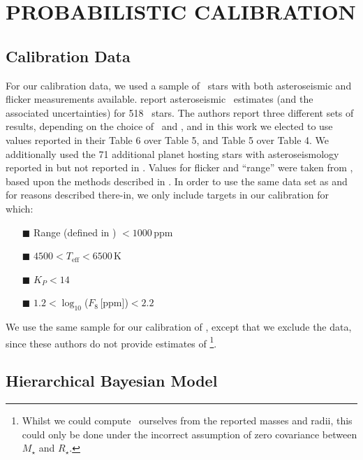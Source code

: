 \section{PROBABILISTIC CALIBRATION}
\label{sec:HBM}


\subsection{Calibration Data}

For our calibration data, we used a sample of \Kepler\ stars with
both asteroseismic and flicker measurements available. \citet{chaplin:2014}
report asteroseismic \rhostar\ estimates (and the associated uncertainties) for
518 \Kepler\ stars. The authors report three different sets of results,
depending on the choice of \Teff\ and \FeH, and in this work we elected to use
values reported in their Table 6 over Table 5, and Table 5 over Table 4. We
additionally used the 71 additional planet hosting stars with asteroseismology
reported in \citet{huber:2013} but not reported in \citet{chaplin:2014}. Values
for flicker and ``range'' were taken from \citet{kipping:2014}, based upon the
methods described in \citet{bastien:2013}.
In order to use the same data set as \citet{kipping:2014} and
for reasons described there-in, we only include targets in our calibration for
which:

\begin{itemize}
\item[{\tiny$\blacksquare$}] Range (defined in \citealt{bastien:2013})
$<1000$\,ppm
\item[{\tiny$\blacksquare$}] $4500<T_{\mathrm{eff}}<6500$\,K
\item[{\tiny$\blacksquare$}] $K_P<14$
\item[{\tiny$\blacksquare$}] $1.2 < \log_{10}$($F_8$\,[ppm])$< 2.2$
\end{itemize}

We use the same sample for our calibration of \logg, except that we exclude the
\citet{huber:2013} data, since these authors do not provide estimates of
\logg\footnote{Whilst we could compute \logg\ ourselves from the reported
masses and radii, this could only be done under the incorrect assumption of
zero covariance between $M_{\star}$ and $R_{\star}$.}.

\subsection{Hierarchical Bayesian Model}

